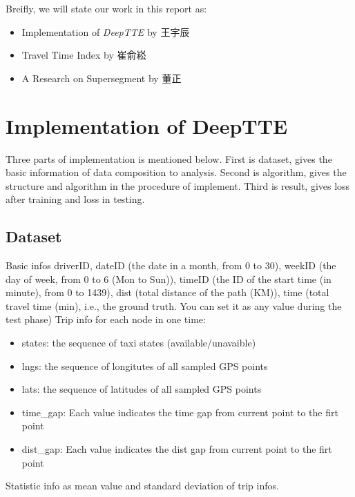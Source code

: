 \documentclass[fontset=none]{ctexart}
\theoremstyle{definition}
\theoremstyle{remark}
\begin{document}
Breifly, we will state our work in this report as:
\begin{itemize}
    \item Implementation of \textit{DeepTTE} by 王宇辰
    \item Travel Time Index by 崔俞崧
    \item A Research on Supersegment by 董正
\end{itemize}

\section{Implementation of DeepTTE}
Three parts of implementation is mentioned below. First is dataset, gives the basic information of data composition to analysis. Second is algorithm, gives the structure and algorithm in the procedure of implement. Third is result, gives loss after training and loss in testing.\cite{wang2018when}
\subsection{Dataset}
Basic infos driverID, dateID (the date in a month, from 0 to 30), weekID (the day of week, from 0 to 6 (Mon to Sun)), timeID (the ID of the start time (in minute), from 0 to 1439), dist (total distance of the path (KM)), time (total travel time (min), i.e., the ground truth. You can set it as any value during the test phase)
Trip info for each node in one time:
\begin{itemize}
  \item states: the sequence of taxi states (available/unavaible)
  \item lngs: the sequence of longitutes of all sampled GPS points
  \item lats: the sequence of latitudes of all sampled GPS points
  \item time\_gap: Each value indicates the time gap from current point to the firt point
  \item dist\_gap: Each value indicates the dist gap from current point to the firt point
\end{itemize}
Statistic info as mean value and standard deviation of trip infos.
\end{document}
